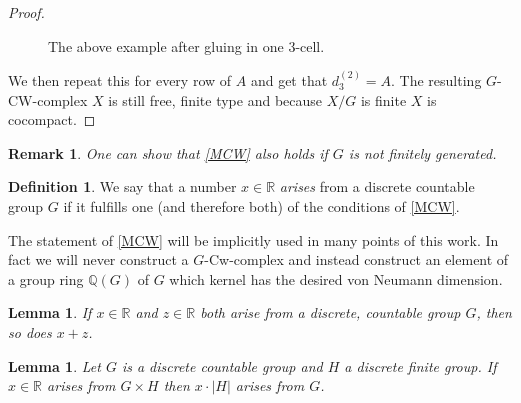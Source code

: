 \documentclass[12pt,a4paper]{scrartcl}
\theoremstyle{plain}
\newtheorem{Lemma}[Theorem]{Lemma}
\newtheorem{Remark}[Theorem]{Remark}
\theoremstyle{definition}
\newtheorem{Definition}[Theorem]{Definition}
\numberwithin{equation}{section}
\newcommand{\R}{\mathbb{R}} %
\newcommand{\Q}{\mathbb{Q}} %
\newcommand{\2}{\mathbb{Z} / 2 \mathbb{Z}}
\newcommand{\1}{\bar{1}}
\newcommand{\0}{\bar{0}}
\begin{document}
\begin{proof}
\begin{figure}[H]
			\caption{The above example after gluing in one $3$-cell.}
			\label{GCW_Grafik2}
		\end{figure}
		
		
	We then repeat this for every row of $A$ and get that $d_3^{(2)} = A$. The resulting $G$-CW-complex $X$ is still free, finite type and because $X/G$ is finite $X$ is cocompact.
\end{proof}




\begin{Remark}
	One can show that \ref{MCW} also holds if $G$ is not finitely generated.
\end{Remark}
\begin{Definition}
	We say that a number $x \in \R$ \emph{arises} from a discrete countable group $G$ if it fulfills one (and therefore both) of the conditions of \ref{MCW}.
\end{Definition}
The statement of \ref{MCW} will be implicitly used in many points of this work. In fact we will never construct a $G$-Cw-complex and instead construct an element of a group ring $\Q (G)$ of $G$ which kernel has the desired von Neumann dimension.


\begin{Lemma}\label{add}
	If $x \in \R$ and $z \in \R$ both arise from a discrete, countable group $G$, then so does $x + z$.
\end{Lemma}
\begin{Lemma}\label{mult}
	Let $G$ is a discrete countable group and $H$ a discrete finite group. If $x \in \R$ arises from $G \times H$ then $x \cdot |H|$ arises from $G$.
\end{Lemma}
\end{document}
